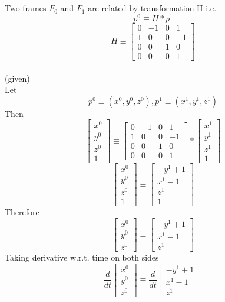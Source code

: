 \documentclass[12pt]{article}
\newcommand{\given}{{\\ \color{blue} \hspace*{\fill}(given)} \\}
\begin{document}
\pagebreak

\section{}
Two frames $F_0$ and $F_1$ are related by transformation H i.e.
\[
  p^0 \equiv H * p^1
\]
\[
  H \equiv
  \begin{bmatrix} 0 & -1 & 0 & 1 \\ 1 & 0 & 0 & -1 \\ 0 & 0 & 1 & 0 \\ 0 & 0 & 0 & 1 \end{bmatrix}
\]
\given
Let
\[
  p^0 \equiv (x^0, y^0, z^0), p^1 \equiv (x^1, y^1, z^1)
\]
Then
\[
  \begin{bmatrix} x^0 \\ y^0 \\ z^0 \\ 1\end{bmatrix} \equiv
  \begin{bmatrix} 0 & -1 & 0 & 1 \\ 1 & 0 & 0 & -1 \\ 0 & 0 & 1 & 0 \\ 0 & 0 & 0 & 1 \end{bmatrix}
  *
  \begin{bmatrix} x^1 \\ y^1 \\ z^1 \\ 1\end{bmatrix}
\]
\[
  \begin{bmatrix} x^0 \\ y^0 \\ z^0 \\ 1\end{bmatrix} \equiv
  \begin{bmatrix} -y^1 + 1 \\ x^1 - 1 \\ z^1 \\ 1\end{bmatrix}
\]
Therefore
\[
  \begin{bmatrix} x^0 \\ y^0 \\ z^0\end{bmatrix} \equiv
  \begin{bmatrix} -y^1 + 1 \\ x^1 - 1 \\ z^1\end{bmatrix}
\]
Taking derivative w.r.t. time on both sides
\[
  \frac{d}{dt}\begin{bmatrix} x^0 \\ y^0 \\ z^0\end{bmatrix} \equiv
  \frac{d}{dt}\begin{bmatrix} -y^1 + 1 \\ x^1 - 1 \\ z^1\end{bmatrix}
\]
\end{document}
